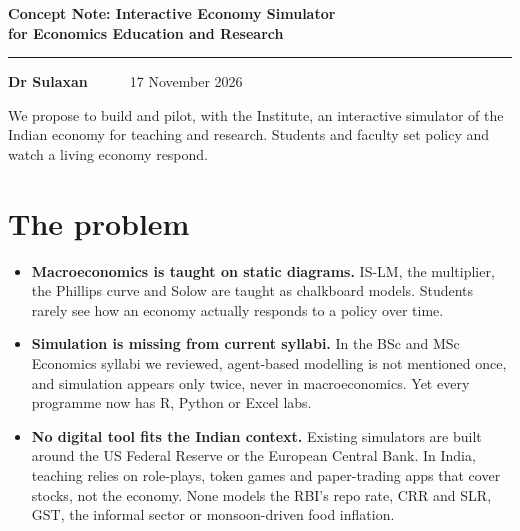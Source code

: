 \documentclass[10pt,a4paper]{article}
\makeatletter
\newcommand*{\authorname}{Dr Sulaxan}
\newcommand*{\contactline}{}          %
\newcommand*{\institute}{}            %
\makeatother
\begin{document}
\fontsize{9.6}{11.5}\selectfont

{\Large\bfseries\color{ink} Concept Note: Interactive Economy Simulator\\[2pt]
for Economics Education and Research\par}
\vspace{4pt}
{\color{accent}\rule{\linewidth}{1.2pt}}\par
\vspace{2pt}
\textbf{\authorname}%
\ifx\institute\empty\else\ \textperiodcentered\ \institute\fi
\ifx\contactline\empty\else\ \textperiodcentered\ \contactline\fi
\hfill 17 November 2026
\vspace{4pt}

We propose to build and pilot, with the Institute, an interactive simulator of the Indian economy for teaching and research. Students and faculty set policy and watch a living economy respond.

\section{The problem}
\begin{itemize}
  \item \textbf{Macroeconomics is taught on static diagrams.} IS-LM, the multiplier, the Phillips curve and Solow are taught as chalkboard models. Students rarely see how an economy actually responds to a policy over time.
  \item \textbf{Simulation is missing from current syllabi.} In the BSc and MSc Economics syllabi we reviewed, agent-based modelling is not mentioned once, and simulation appears only twice, never in macroeconomics. Yet every programme now has R, Python or Excel labs.
  \item \textbf{No digital tool fits the Indian context.} Existing simulators are built around the US Federal Reserve or the European Central Bank. In India, teaching relies on role-plays, token games and paper-trading apps that cover stocks, not the economy. None models the RBI's repo rate, CRR and SLR, GST, the informal sector or monsoon-driven food inflation.
\end{itemize}
\end{document}
